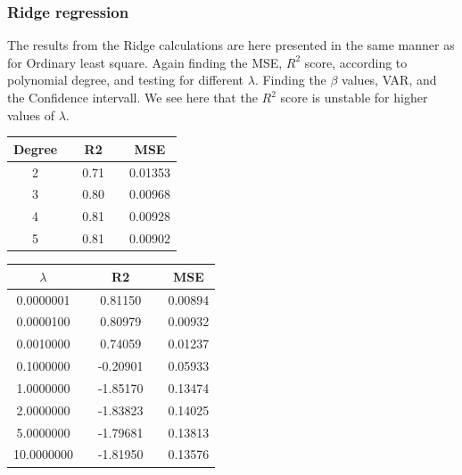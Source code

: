  
\subsubsection{Ridge regression}
The results from the Ridge calculations are here presented in the same manner as for Ordinary least square. Again finding the MSE, $R^2$ score, according to polynomial degree, and testing for different $\lambda$. Finding the $\beta$ values, VAR, and the Confidence intervall. We see here that the $R^2$ score is unstable for higher values of $\lambda$.
 
 \pagebreak
 \begin{center}
 \label{tab:Ridge_Degree_R2_MSE}
 \begin{tabularx}{\textwidth}{c X c X c  }
     \hline
     \hline
         Degree && R2 && MSE \\
         \hline
2      && 0.71 && 0.01353 \\ 
3      && 0.80 && 0.00968 \\ 
4      && 0.81 && 0.00928 \\ 
5      && 0.81 && 0.00902 \\ \hline
 \end{tabularx}
 \end{center}
 
 
\begin{center}
 \label{tab:OLS_lambda_R2_MSE}
 \begin{tabularx}{\textwidth}{c X c X c  }
     \hline
     \hline
         $\lambda$ && R2 && MSE \\
         \hline
 0.0000001  && 0.81150  && 0.00894 \\
0.0000100  && 0.80979  && 0.00932 \\
0.0010000  && 0.74059  && 0.01237 \\
0.1000000  && -0.20901 && 0.05933 \\
1.0000000  && -1.85170 && 0.13474 \\
2.0000000  && -1.83823 && 0.14025 \\
5.0000000  && -1.79681 && 0.13813 \\
10.0000000 && -1.81950 && 0.13576\\ \hline
 \end{tabularx}
 \end{center}



